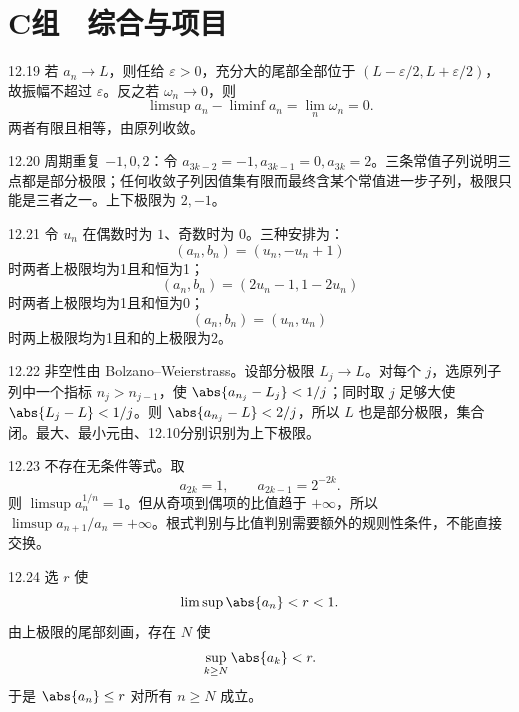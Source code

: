 \section*{C组　综合与项目}

\begin{solution}{12.19}
若 \(a_n\to L\)，则任给 \(\varepsilon>0\)，充分大的尾部全部位于
\((L-\varepsilon/2,L+\varepsilon/2)\)，故振幅不超过 \(\varepsilon\)。反之若 \(\omega_n\to0\)，则
\[
 \limsup a_n-\liminf a_n
 =\lim_n\omega_n=0.
\]
两者有限且相等，由原列收敛。
\end{solution}

\begin{solution}{12.20}
周期重复 \(-1,0,2\)：令
\(a_{3k-2}=-1,a_{3k-1}=0,a_{3k}=2\)。三条常值子列说明三点都是部分极限；任何收敛子列因值集有限而最终含某个常值进一步子列，极限只能是三者之一。上下极限为 \(2,-1\)。
\end{solution}

\begin{solution}{12.21}
令 \(u_n\) 在偶数时为 \(1\)、奇数时为 \(0\)。三种安排为：
\[
 (a_n,b_n)=(u_n,-u_n+1)
\]
时两者上极限均为1且和恒为1；
\[
 (a_n,b_n)=(2u_n-1,1-2u_n)
\]
时两者上极限均为1且和恒为0；
\[
 (a_n,b_n)=(u_n,u_n)
\]
时两上极限均为1且和的上极限为2。
\end{solution}

\begin{solution}{12.22}
非空性由 Bolzano--Weierstrass。设部分极限 \(L_j\to L\)。对每个 \(j\)，选原列子列中一个指标 \(n_j>n_{j-1}\)，使
\(\abs{a_{n_j}-L_j}<1/j\)；同时取 \(j\) 足够大使 \(\abs{L_j-L}<1/j\)。则
\(\abs{a_{n_j}-L}<2/j\)，所以 \(L\) 也是部分极限，集合闭。最大、最小元由、12.10分别识别为上下极限。
\end{solution}

\begin{solution}{12.23}
不存在无条件等式。取
\[
 a_{2k}=1,\qquad a_{2k-1}=2^{-2k}.
\]
则 \(\limsup a_n^{1/n}=1\)。但从奇项到偶项的比值趋于 \(+\infty\)，所以
\(\limsup a_{n+1}/a_n=+\infty\)。根式判别与比值判别需要额外的规则性条件，不能直接交换。
\end{solution}

\begin{solution}{12.24}
选 \(r\) 使
\[
 \limsup\abs{a_n}<r<1.
\]
由上极限的尾部刻画，存在 \(N\) 使
\[
 \sup_{k\ge N}\abs{a_k}<r.
\]
于是 \(\abs{a_n}\le r\) 对所有 \(n\ge N\) 成立。
\end{solution}

